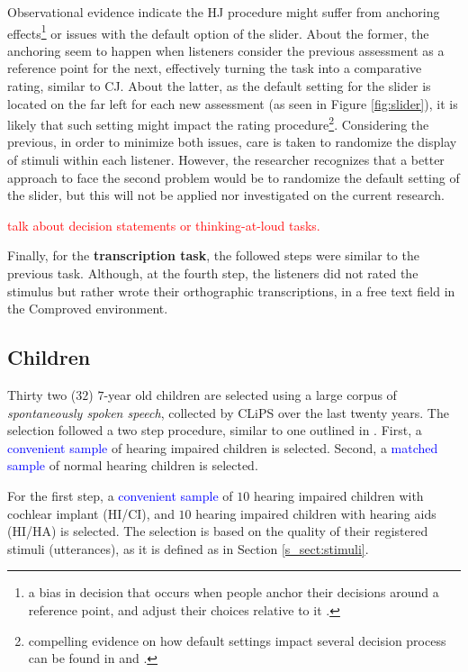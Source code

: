 Observational evidence indicate the HJ procedure might suffer from anchoring effects\footnote{a bias in decision that occurs when people anchor their decisions around a reference point, and adjust their choices relative to it \cite{Baddeley_2017, Kahneman_2013}.} or issues with the default option of the slider. About the former, the anchoring seem to happen when listeners consider the previous assessment as a reference point for the next, effectively turning the task into a comparative rating, similar to CJ. About the latter, as the default setting for the slider is located on the far left for each new assessment (as seen in Figure \ref{fig:slider}), it is likely that such setting might impact the rating procedure\footnote{compelling evidence on how default settings impact several decision process can be found in \citet{Kahneman_2013} and \citet{Johnson_et_al_2003}.}. Considering the previous, in order to minimize both issues, care is taken to randomize the display of stimuli within each listener. However, the researcher recognizes that a better approach to face the second problem would be to randomize the default setting of the slider, but this will not be applied nor investigated on the current research. 

\textcolor{red}{talk about decision statements or thinking-at-loud tasks.}

Finally, for the \textbf{transcription task}, the followed steps were similar to the previous task. Although, at the fourth step, the listeners did not rated the stimulus but rather wrote their orthographic transcriptions, in a free text field in the Comproved environment.
%
%
\subsection{Children} \label{s_sect:children}
%
Thirty two ($32$) $7$-year old children are selected using a large corpus of \textit{spontaneously spoken speech}, collected by CLiPS over the last twenty years. The selection followed a two step procedure, similar to one outlined in \citet{Faes_et_al_2021}. First, a \textcolor{blue}{convenient sample} of hearing impaired children is selected. Second, a \textcolor{blue}{matched sample} of normal hearing children is selected.

For the first step, a \textcolor{blue}{convenient sample} of $10$ hearing impaired children with cochlear implant (HI/CI), and $10$ hearing impaired children with hearing aids (HI/HA) is selected. The selection is based on the quality of their registered stimuli (utterances), as it is defined as in Section \ref{s_sect:stimuli}.

